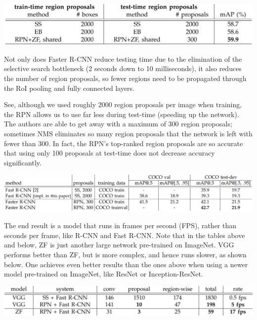 \documentclass{article}
\begin{document}
\begin{center}
\includegraphics[scale=0.35]{fasterresults.PNG}
\end{center}

Not only does Faster R-CNN reduce testing time due to the elimination of the selective search bottleneck (2 seconds down to 10 milliseconds), it also reduces the number of region proposals, so fewer regions need to be propagated through the RoI pooling and fully connected layers.

See, although we used roughly 2000 region proposals per image when training, the RPN allows us to use far less during test-time (speeding up the network). The authors are able to get away with a maximum of 300 region proposals; sometimes NMS eliminates so many region proposals that the network is left with fewer than 300. In fact, the RPN's top-ranked region proposals are so accurate that using only 100 proposals at test-time does not decrease accuracy significantly.

\begin{center}
\includegraphics[scale=0.35]{fastercoco.PNG}
\end{center}

The end result is a model that runs in frames per second (FPS), rather than seconds per frame, like R-CNN and Fast R-CNN. Note that in the tables above and below, ZF is just another large network pre-trained on ImageNet. VGG performs better than ZF, but is more complex, and hence runs slower, as shown below. One achieves even better results than the ones above when using a newer model pre-trained on ImageNet, like ResNet or Inception-ResNet.

\begin{center}
\includegraphics[scale=0.35]{fasterspeed.PNG}
\end{center}
\end{document}
